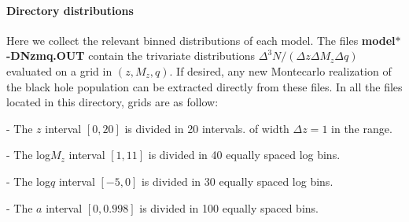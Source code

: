 \documentclass{iopart}
\newenvironment{itemize_estret}{
\begin{itemize}
  \setlength{\itemsep}{1pt}
  \setlength{\parskip}{0pt}
  \setlength{\parsep}{0pt}
}{\end{itemize}}
\begin{document}
\paragraph{Directory distributions}
Here we collect the relevant binned distributions of each model.
The files {\bf model$*$-DNzmq.OUT} contain the trivariate distributions 
$\Delta^3N/(\Delta{z}\Delta{M_z}\Delta{q})$ evaluated on a grid in $(z,M_z,q)$.
If desired, any new Montecarlo realization of the black hole population can 
be extracted directly from these files.
In all the files located in this directory, grids are as follow:
\begin{itemize_estret}
\item[-] The $z$ interval $[0,20]$ is divided in 20 intervals. 
of width $\Delta{z}=1$ in the range.  
\item[-] The log$M_z$ interval $[1,11]$ is divided in 40 equally spaced log bins.
\item[-] The log$q$ interval $[-5,0]$ is divided in 30 equally spaced log bins.
\item[-] The $a$ interval $[0,0.998]$ is divided in 100 equally spaced bins.
\end{itemize_estret}
\end{document}
